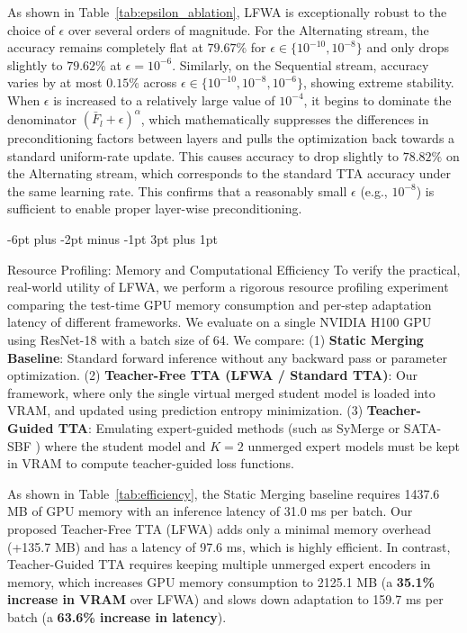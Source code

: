 \documentclass{article}
\makeatletter
\theoremstyle{plain}
\theoremstyle{definition}
\theoremstyle{remark}
\renewcommand{\subsection}{\@startsection{subsection}{2}{\z@}%
                          {-6pt plus -2pt minus -1pt}%
                          {3pt plus 1pt}%
                          {\normalfont\normalsize\bfseries\raggedright}}
\makeatother
\begin{document}
As shown in Table~\ref{tab:epsilon_ablation}, LFWA is exceptionally robust to the choice of $\epsilon$ over several orders of magnitude. For the Alternating stream, the accuracy remains completely flat at $79.67\%$ for $\epsilon \in \{10^{-10}, 10^{-8}\}$ and only drops slightly to $79.62\%$ at $\epsilon=10^{-6}$. Similarly, on the Sequential stream, accuracy varies by at most $0.15\%$ across $\epsilon \in \{10^{-10}, 10^{-8}, 10^{-6}\}$, showing extreme stability. 
When $\epsilon$ is increased to a relatively large value of $10^{-4}$, it begins to dominate the denominator $(\bar{F}_l + \epsilon)^\alpha$, which mathematically suppresses the differences in preconditioning factors between layers and pulls the optimization back towards a standard uniform-rate update. This causes accuracy to drop slightly to $78.82\%$ on the Alternating stream, which corresponds to the standard TTA accuracy under the same learning rate. This confirms that a reasonably small $\epsilon$ (e.g., $10^{-8}$) is sufficient to enable proper layer-wise preconditioning.

\subsection{Resource Profiling: Memory and Computational Efficiency}
To verify the practical, real-world utility of LFWA, we perform a rigorous resource profiling experiment comparing the test-time GPU memory consumption and per-step adaptation latency of different frameworks. We evaluate on a single NVIDIA H100 GPU using ResNet-18 with a batch size of 64. We compare: (1) \textbf{Static Merging Baseline}: Standard forward inference without any backward pass or parameter optimization. (2) \textbf{Teacher-Free TTA (LFWA / Standard TTA)}: Our framework, where only the single virtual merged student model is loaded into VRAM, and updated using prediction entropy minimization. (3) \textbf{Teacher-Guided TTA}: Emulating expert-guided methods (such as SyMerge \cite{jung2025symerge} or SATA-SBF \cite{submission1}) where the student model and $K=2$ unmerged expert models must be kept in VRAM to compute teacher-guided loss functions.

As shown in Table~\ref{tab:efficiency}, the Static Merging baseline requires 1437.6 MB of GPU memory with an inference latency of 31.0 ms per batch. Our proposed Teacher-Free TTA (LFWA) adds only a minimal memory overhead (+135.7 MB) and has a latency of 97.6 ms, which is highly efficient. 
In contrast, Teacher-Guided TTA requires keeping multiple unmerged expert encoders in memory, which increases GPU memory consumption to 2125.1 MB (a \textbf{35.1\% increase in VRAM} over LFWA) and slows down adaptation to 159.7 ms per batch (a \textbf{63.6\% increase in latency}). 
\end{document}
